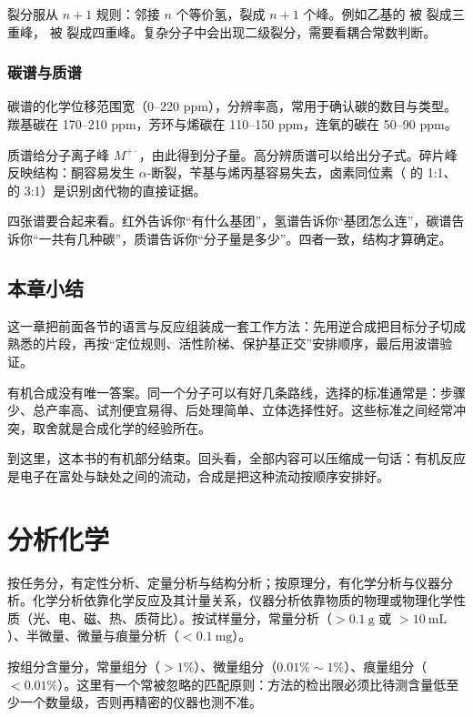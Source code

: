 \documentclass[UTF8]{ctexbook}
\begin{document}
裂分服从 $n+1$ 规则：邻接 $n$ 个等价氢，裂成 $n+1$ 个峰。例如乙基的  被  裂成三重峰， 被  裂成四重峰。复杂分子中会出现二级裂分，需要看耦合常数判断。

\subsection{碳谱与质谱}

碳谱的化学位移范围宽（0--220 ppm），分辨率高，常用于确认碳的数目与类型。羰基碳在 170--210 ppm，芳环与烯碳在 110--150 ppm，连氧的碳在 50--90 ppm。

质谱给分子离子峰 $M^{+\cdot}$，由此得到分子量。高分辨质谱可以给出分子式。碎片峰反映结构：酮容易发生 $\alpha$-断裂，苄基与烯丙基容易失去，卤素同位素（ 的 1:1、 的 3:1）是识别卤代物的直接证据。

四张谱要合起来看。红外告诉你“有什么基团”，氢谱告诉你“基团怎么连”，碳谱告诉你“一共有几种碳”，质谱告诉你“分子量是多少”。四者一致，结构才算确定。

\newpage
\section{本章小结}

这一章把前面各节的语言与反应组装成一套工作方法：先用逆合成把目标分子切成熟悉的片段，再按“定位规则、活性阶梯、保护基正交”安排顺序，最后用波谱验证。

有机合成没有唯一答案。同一个分子可以有好几条路线，选择的标准通常是：步骤少、总产率高、试剂便宜易得、后处理简单、立体选择性好。这些标准之间经常冲突，取舍就是合成化学的经验所在。

到这里，这本书的有机部分结束。回头看，全部内容可以压缩成一句话：有机反应是电子在富处与缺处之间的流动，合成是把这种流动按顺序安排好。

\newpage



\chapter{分析化学}

按任务分，有定性分析、定量分析与结构分析；按原理分，有化学分析与仪器分析。化学分析依靠化学反应及其计量关系，仪器分析依靠物质的物理或物理化学性质（光、电、磁、热、质荷比）。按试样量分，常量分析（$>0.1\ \mathrm{g}$ 或 $>10\ \mathrm{mL}$）、半微量、微量与痕量分析（$<0.1\ \mathrm{mg}$）。

按组分含量分，常量组分（$>1\%$）、微量组分（$0.01\%\sim1\%$）、痕量组分（$<0.01\%$）。这里有一个常被忽略的匹配原则：方法的检出限必须比待测含量低至少一个数量级，否则再精密的仪器也测不准。
\end{document}
